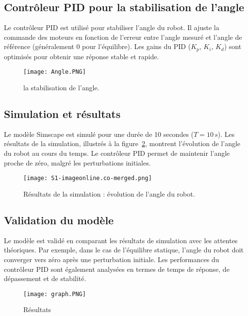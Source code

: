 \documentclass{report}
\begin{document}
\subsection{Contrôleur PID pour la stabilisation de l'angle}
\label{subsec:pid}

Le contrôleur PID est utilisé pour stabiliser l'angle du robot. Il ajuste la commande des moteurs en fonction de l'erreur entre l'angle mesuré et l'angle de référence (généralement 0 pour l'équilibre). Les gains du PID (\(K_p\), \(K_i\), \(K_d\)) sont optimisés pour obtenir une réponse stable et rapide.
\begin{figure}[h]
    \centering
    \texttt{[image: Angle.PNG]}
    \caption{la stabilisation de l’angle.}
    \label{fig:La stabilisation de l’angle}
\end{figure}

\subsection{Simulation et résultats}
\label{subsec:simulation}

Le modèle Simscape est simulé pour une durée de 10 secondes (\(T = 10\,s\)). Les résultats de la simulation, illustrés à la figure~\ref{fig:sim_results}, montrent l'évolution de l'angle du robot au cours du temps. Le contrôleur PID permet de maintenir l'angle proche de zéro, malgré les perturbations initiales.

\begin{figure}[h]
    \centering
    \texttt{[image: S1-imageonline.co-merged.png]} %
    \caption{Résultats de la simulation : évolution de l'angle du robot.}
    \label{fig:sim_results}
\end{figure}
\vspace{5cm}
\subsection{Validation du modèle}
\label{subsec:validation}

Le modèle est validé en comparant les résultats de simulation avec les attentes théoriques. Par exemple, dans le cas de l'équilibre statique, l'angle du robot doit converger vers zéro après une perturbation initiale. Les performances du contrôleur PID sont également analysées en termes de temps de réponse, de dépassement et de stabilité.
\begin{figure}[h]
    \centering
    \texttt{[image: graph.PNG]} %
    \caption{Résultats }
    \label{fig:Validation du modèle}
\end{figure}
\vspace{14cm}
\end{document}

